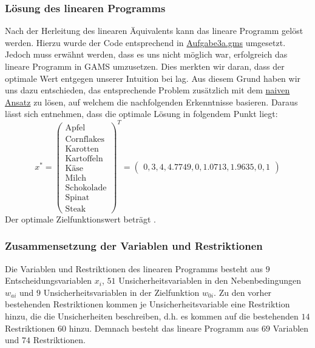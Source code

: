 \documentclass[a4paper,12pt]{article}
\begin{document}
\newpage

\subsubsection*{L\"osung des linearen Programms}

Nach der Herleitung des linearen \"Aquivalents kann das lineare Programm gel\"ost werden. Hierzu wurde der Code entsprechend in \href{../src/r3/Aufgabe3a.gms}{Aufgabe3a.gms} umgesetzt.
Jedoch muss erw\"ahnt werden, dass es uns nicht m\"oglich war, erfolgreich das lineare Programm in GAMS umzusetzen. Dies merkten wir daran, dass der optimale Wert entgegen unserer Intuition bei  lag. Aus diesem Grund haben wir uns dazu entschieden, das entsprechende Problem zus\"atzlich mit dem \href{../src/r3/Aufgabe3a_NaiveApproach.gms}{naiven Ansatz} zu l\"osen, auf welchem die nachfolgenden Erkenntnisse basieren.
Daraus l\"asst sich entnehmen, dass die optimale L\"osung in folgendem Punkt liegt:
\[
x^* = \begin{pmatrix}
    \text{Apfel} \\ \text{Cornflakes} \\ \text{Karotten} \\ \text{Kartoffeln} \\ \text{K\"ase} \\ \text{Milch} \\ \text{Schokolade} \\ \text{Spinat} \\ \text{Steak}
    \end{pmatrix}^T
     =
     \begin{pmatrix}
     0, 3, 4, 4.7749, 0, 1.0713, 1.9635, 0, 1
        \end{pmatrix}
\]
Der optimale Zielfunktionswert betr\"agt .

\subsubsection*{Zusammensetzung der Variablen und Restriktionen} 

Die Variablen und Restriktionen des linearen Programms besteht aus $9$ Entscheidungsvariablen $x_i$, $51$ Unsicherheitsvariablen in den Nebenbedingungen $w_{ai}$ und $9$ Unsicherheitsvariablen in der Zielfunktion $w_{0i}$.
Zu den vorher bestehenden Restriktionen kommen je Unsicherheitsvariable eine Restriktion hinzu, die die Unsicherheiten beschreiben, d.h. es kommen auf die bestehenden $14$ Restriktionen $60$ hinzu.
Demnach besteht das lineare Programm aus $69$ Variablen und $74$ Restriktionen.
\end{document}
